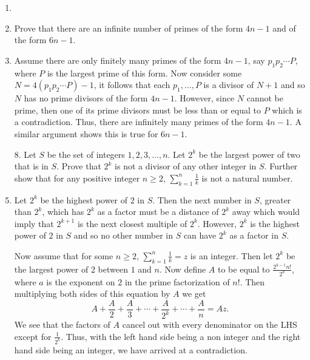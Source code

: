 \documentclass[12pt]{article}
\makeatletter
\theoremstyle{definition}
\theoremstyle{remark}
\renewenvironment{proof}[1][\proofname]{\par
  \pushQED{\qed}%
  \normalfont \topsep6\p@\@plus6\p@\relax
  \list{}{\leftmargin=0mm
          \rightmargin=4mm
          \settowidth{\itemindent}{\itshape#1}%
          \labelwidth=\itemindent
          \parsep=0pt \listparindent=\parindent 
  }
  \item[\hskip\labelsep
        \itshape
    #1\@addpunct{.}]\ignorespaces
}{%
  \popQED\endlist\@endpefalse
}
\let\oldproofname=\proofname
\renewcommand{\proofname}{\bf{\textit{\oldproofname}}}
\makeatother
\begin{document}
\begin{enumerate}[leftmargin=*]
\begin{proof}
            \end{proof}
        \item Prove that there are an infinite number of primes of the form $4n-1$ and of the form $6n-1$. 
            \begin{proof}
                Assume there are only finitely many primes of the form $4n-1$, say $p_1p_2\cdots P$, where $P$ is the largest prime of this form. Now consider some $N=4(p_1p_2\cdots P)-1$, it follows that each $p_1,\dots, P$ is a divisor of $N+1$ and so $N$ has no prime divisors of the form $4n-1$. However, since $N$ cannot be prime, then one of its prime divisors must be less than or equal to $P$ which is a contradiction. Thus, there are infinitely many primes of the form $4n-1$. A similar argument shows this is true for $6n-1$. 
            \end{proof}
        \item[8.] Let $S$ be the set of integers $1,2,3,\dots,n$. Let $2^k$ be the largest power of two that is in $S$. Prove that $2^k$ is not a divisor of any other integer in $S$. Further show that for any positive integer $n\geq 2$, $\sum_{k=1}^n\frac{1}{k}$ is not a natural number.
            \begin{proof}
                Let $2^k$ be the highest power of $2$ in $S$. Then the next number in $S$, greater than $2^k$, which has $2^k$ as a factor must be a distance of $2^k$ away which would imply that $2^{k+1}$ is the next closest multiple of $2^k$. However, $2^k$ is the highest power of $2$ in $S$ and so no other number in $S$ can have $2^k$ as a factor in $S$.\hfill\par\hspace{4mm} Now assume that for some $n\geq 2$, $\sum_{k=1}^n \frac{1}{k}=z$ is an integer. Then let $2^k$ be the largest power of 2 between $1$ and $n$. Now define $A$ to be equal to $\frac{2^{k-1}n!}{2^a}$, where $a$ is the exponent on $2$ in the prime factorization of $n!$. Then multiplying both sides of this equation by $A$ we get 
                    \begin{equation*}
                        A+\frac{A}{2}+\frac{A}{3}+\cdots+\frac{A}{2^k}+\cdots+\frac{A}{n}=Az.
                    \end{equation*}
                We see that the factors of $A$ cancel out with every denominator on the LHS except for $\frac{1}{2^k}$. Thus, with the left hand side being a non integer and the right hand side being an integer, we have arrived at a contradiction.
            \end{proof}
    \end{enumerate}
\end{document}
